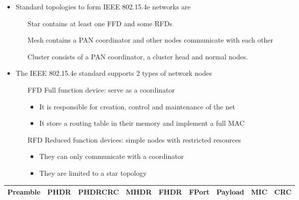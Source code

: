 \begin{itemize}
	\item Standard topologies to form IEEE 802.15.4e networks are 
	\begin{itemize}
		\item[Star] contains at least one FFD and some RFDs
		\item[Mesh] contains a PAN coordinator and other nodes communicate with each other
		\item[Cluster] consists of a PAN coordinator, a cluster head and normal nodes.
	\end{itemize}
	\item The IEEE 802.15.4e standard supports 2 types of network nodes
	\begin{itemize}
		\item[FFD] Full function device: serve as a coordinator
		\begin{itemize}
			\item It is responsible for creation, control and maintenance of the net
			\item It store a routing table in their memory and implement a full MAC
		\end{itemize}
		\item[RFD] Reduced function devices: simple nodes with restricted resources
		\begin{itemize}
			\item They can only communicate with a coordinator
			\item They are limited to a star topology
		\end{itemize}
	\end{itemize}
\end{itemize}
\begin{tabulary}{\textwidth}{|C|C|C|C|C|C|C|C|C|}\hline
	Preamble & PHDR & PHDRCRC & MHDR & FHDR & FPort & Payload & MIC & CRC \\\hline
\end{tabulary}



